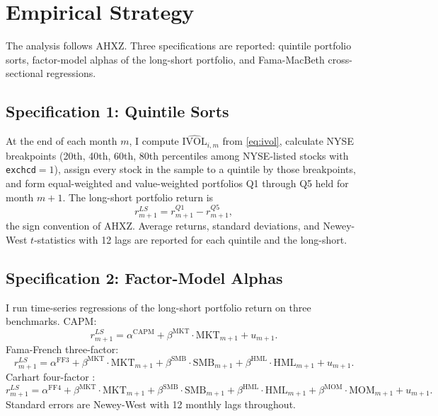 \documentclass[12pt]{article}
\newcommand{\1}[1]{\mathds{1}\left[#1\right]}
\begin{document}
\section{Empirical Strategy}\label{sec:strategy}

The analysis follows AHXZ. Three specifications are reported: quintile
portfolio sorts, factor-model alphas of the long-short portfolio, and
Fama-MacBeth cross-sectional regressions.

\subsection{Specification 1: Quintile Sorts}

At the end of each month $m$, I compute $\widehat{\mathrm{IVOL}}_{i,m}$ from
\eqref{eq:ivol}, calculate NYSE breakpoints (20th, 40th, 60th, 80th
percentiles among NYSE-listed stocks with \texttt{exchcd}$=1$), assign every
stock in the sample to a quintile by those breakpoints, and form
equal-weighted and value-weighted portfolios Q1 through Q5 held for month
$m{+}1$. The long-short portfolio return is
\begin{equation}\label{eq:ls}
r^{LS}_{m+1} = r^{Q1}_{m+1} - r^{Q5}_{m+1},
\end{equation}
the sign convention of AHXZ. Average returns, standard deviations, and
Newey-West $t$-statistics with 12 lags \citep{newey1987simple} are reported
for each quintile and the long-short.

\subsection{Specification 2: Factor-Model Alphas}

I run time-series regressions of the long-short portfolio return on three
benchmarks. CAPM:
\begin{equation}\label{eq:capm}
r^{LS}_{m+1} = \alpha^{\mathrm{CAPM}} + \beta^{\mathrm{MKT}}
\cdot \mathrm{MKT}_{m+1} + u_{m+1}.
\end{equation}
Fama-French three-factor:
\begin{equation}\label{eq:ff3}
r^{LS}_{m+1} = \alpha^{\mathrm{FF3}} + \beta^{\mathrm{MKT}} \cdot
\mathrm{MKT}_{m+1} + \beta^{\mathrm{SMB}} \cdot \mathrm{SMB}_{m+1}
+ \beta^{\mathrm{HML}} \cdot \mathrm{HML}_{m+1} + u_{m+1}.
\end{equation}
Carhart four-factor \citep{carhart1997persistence}:
\begin{equation}\label{eq:ff4}
r^{LS}_{m+1} = \alpha^{\mathrm{FF4}} + \beta^{\mathrm{MKT}} \cdot
\mathrm{MKT}_{m+1} + \beta^{\mathrm{SMB}} \cdot \mathrm{SMB}_{m+1}
+ \beta^{\mathrm{HML}} \cdot \mathrm{HML}_{m+1}
+ \beta^{\mathrm{MOM}} \cdot \mathrm{MOM}_{m+1} + u_{m+1}.
\end{equation}
Standard errors are Newey-West with 12 monthly lags throughout.
\end{document}
